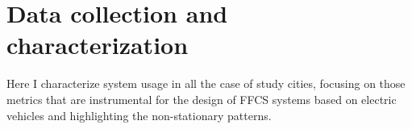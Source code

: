 \section{Data collection and characterization}
\label{sec:6_2_data}

Here I characterize system usage in all the case of study cities, focusing on those metrics that are instrumental for the design of FFCS systems based on electric vehicles and highlighting the non-stationary patterns. 

%
